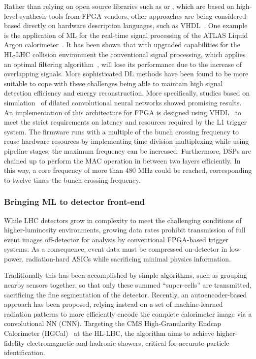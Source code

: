 Rather than relying on open source libraries such as \hlsfml or \conifer, which are based on high-level synthesis tools from FPGA vendors, other approaches are being considered based directly on hardware description languages, such as VHDL~\cite{Nottbeck:2019rqu,Fritzsche2020}. 
One example is the application of ML for the real-time signal processing of the ATLAS Liquid Argon calorimeter~\cite{atlas1996atlas}. 
It has been shown that with upgraded capabilities for the HL-LHC collision environment the conventional signal processing, which applies an optimal filtering algorithm~\cite{Cleland:2002rya}, will lose its performance due to the increase of overlapping signals. 
More sophisticated DL methods have been found to be more suitable to cope with these challenges being able to maintain high signal detection efficiency and energy reconstruction. 
More specifically, studies based on simulation~\cite{madysa-chep} of dilated convolutional neural networks showed promising results. An implementation of this architecture for FPGA is designed using VHDL~\cite{Fritzsche2020} to meet the strict requirements on latency and resources required by the L1 trigger system. 
The firmware runs with a multiple of the bunch crossing frequency to reuse hardware resources by implementing time division multiplexing while using pipeline stages, the maximum frequency can be increased. 
Furthermore, DSPs are chained up to perform the MAC operation in between two layers efficiently. In this way, a core frequency of more than 480 MHz could be reached, corresponding to twelve times the bunch crossing frequency.

\subsubsection{Bringing ML to detector front-end}

While LHC detectors grow in complexity to meet the challenging conditions of higher-luminosity environments, growing data rates prohibit transmission of full event images off-detector for analysis by conventional FPGA-based trigger systems.
As a consequence, event data must be compressed on-detector in low-power, radiation-hard ASICs while sacrificing minimal physics information.

Traditionally this has been accomplished by simple algorithms, such as grouping nearby sensors together, so that only these summed ``super-cells'' are transmitted, sacrificing the fine segmentation of the detector.
Recently, an autoencoder-based approach has been proposed, relying instead on a set of machine-learned radiation patterns to more efficiently encode the complete calorimeter image via a convolutional NN (CNN).
Targeting the CMS High-Granularity Endcap Calorimeter (HGCal)~\cite{collaboration:2017gbu} at the HL-LHC, the algorithm aims to achieve higher-fidelity electromagnetic and hadronic showers, critical for accurate particle identification.

